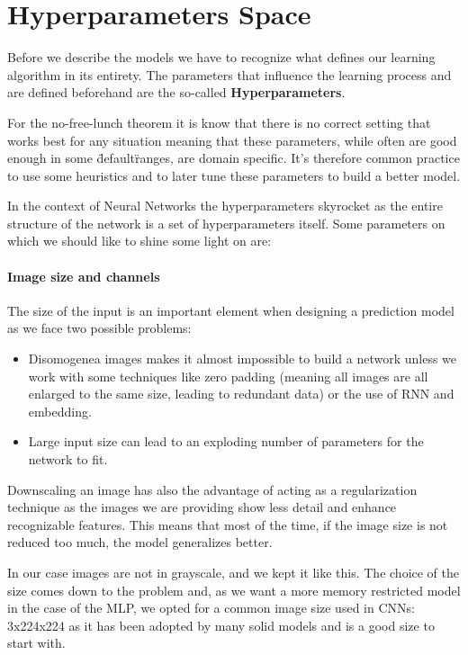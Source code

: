 \newpage


\section{Hyperparameters Space}
\label{sec:hyperparameters-space}

Before we describe the models we have to recognize what defines our learning algorithm in its entirety.
The parameters that influence the learning process and are defined beforehand are the so-called \textbf{Hyperparameters}.

For the no-free-lunch theorem it is know that there is no correct setting that works best for any situation meaning
that these parameters, while often are good enough in some \"default\" ranges, are domain specific.
It's therefore common practice to use some heuristics and to later tune these parameters to build a better model.

In the context of Neural Networks the hyperparameters skyrocket as the entire structure of the network
is a set of hyperparameters itself. Some parameters on which we should like to shine some light on are:

\paragraph{Image size and channels}
The size of the input is an important element when designing a prediction model as we face two possible problems:
\begin{itemize}
    \item Disomogenea images makes it almost impossible to build a network unless we work with some techniques like
    zero padding (meaning all images are all enlarged to the same size, leading to redundant data) or the use of RNN and embedding. %
    \item Large input size can lead to an exploding number of parameters for the network to fit.
\end{itemize}

Downscaling an image has also the advantage of acting as a regularization technique as the images we are providing
show less detail and enhance recognizable features.
This means that most of the time, if the image size is not reduced too much, the model generalizes better.

In our case images are not in grayscale, and we kept it like this.
The choice of the size comes down to the problem and, as we want a more memory restricted model in the case of the MLP,
we opted for a common image size used in CNNs: 3x224x224 as it has been adopted by many solid models and is a good size to start with.

